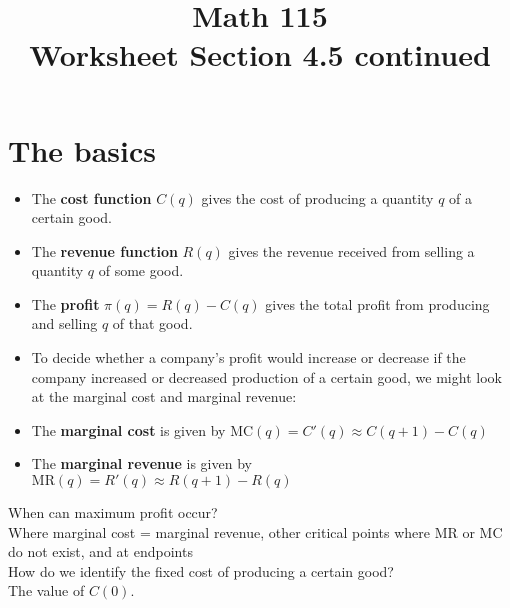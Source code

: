 \documentclass[11pt]{exam}
\title{\vspace{-0.5in} Math 115 \\ Worksheet Section
  4.5 continued}
\date{}
\begin{document}
\maketitle
\section*{The basics}
\begin{itemize}
\item The {\bf cost function} $C(q)$ gives the cost of producing a
  quantity $q$ of a certain good.

 \item The {\bf revenue function} $R(q)$ gives the revenue received from
  selling a quantity $q$ of some good.

  \item The {\bf profit} $\pi(q)=R(q)-C(q)$ gives the total profit from
  producing and selling $q$ of that good.

  \item To decide whether a company's profit would increase or decrease if
  the company increased or decreased production of a certain good, we
  might look at the marginal cost and marginal revenue:

  \item The {\bf marginal cost} is given by
  $\textrm{MC}(q)= C'(q)\approx C(q+1)-C(q)$

  \item The {\bf marginal revenue} is given by
  $\textrm{MR}(q)= R'(q) \approx R(q+1)-R(q)$
\end{itemize}
\vspace{1em}

\noindent
When can maximum profit occur? \\

 Where marginal cost = marginal revenue, other critical points where
  MR or MC do not exist, and at endpoints \\

\noindent
How do we identify the fixed cost of producing a certain good? \\

The value of \(C(0)\).

\pagebreak
    \ifprintanswers 
    
    \else
    
    \fi
\pagebreak
    \ifprintanswers 
    
    \else
    
    \fi
\pagebreak
    \ifprintanswers 
    
    \else
    
    \fi
\pagebreak
    \ifprintanswers 
    
    \else
    
    \fi
\pagebreak
    \ifprintanswers 
    
    \else
    
    \fi
\pagebreak
    \ifprintanswers 
    
    \else
    
    \fi
\end{document}

